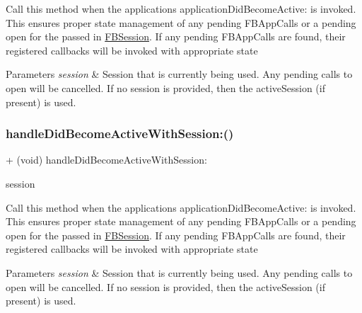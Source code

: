 Call this method when the application\textquotesingle{}s application\+Did\+Become\+Active\+: is invoked. This ensures proper state management of any pending F\+B\+App\+Calls or a pending open for the passed in \hyperlink{interfaceFBSession}{F\+B\+Session}. If any pending F\+B\+App\+Calls are found, their registered callbacks will be invoked with appropriate state


\begin{DoxyParams}{Parameters}
{\em session} & Session that is currently being used. Any pending calls to open will be cancelled. If no session is provided, then the active\+Session (if present) is used. \\
\hline
\end{DoxyParams}
\mbox{\label{interfaceFBAppCall_aa00467d180eab724577daeeb205524a4}} 
\subsubsection{\texorpdfstring{handle\+Did\+Become\+Active\+With\+Session\+:()}{handleDidBecomeActiveWithSession:()}\hspace{0.1cm}{\footnotesize\ttfamily [3/5]}}
{\footnotesize\ttfamily + (void) handle\+Did\+Become\+Active\+With\+Session\+: \begin{DoxyParamCaption}\item[{(\hyperlink{interfaceFBSession}{F\+B\+Session} $\ast$)}]{session }\end{DoxyParamCaption}}

Call this method when the application\textquotesingle{}s application\+Did\+Become\+Active\+: is invoked. This ensures proper state management of any pending F\+B\+App\+Calls or a pending open for the passed in \hyperlink{interfaceFBSession}{F\+B\+Session}. If any pending F\+B\+App\+Calls are found, their registered callbacks will be invoked with appropriate state


\begin{DoxyParams}{Parameters}
{\em session} & Session that is currently being used. Any pending calls to open will be cancelled. If no session is provided, then the active\+Session (if present) is used. \\
\hline
\end{DoxyParams}
\mbox{\label{interfaceFBAppCall_aa00467d180eab724577daeeb205524a4}} 
